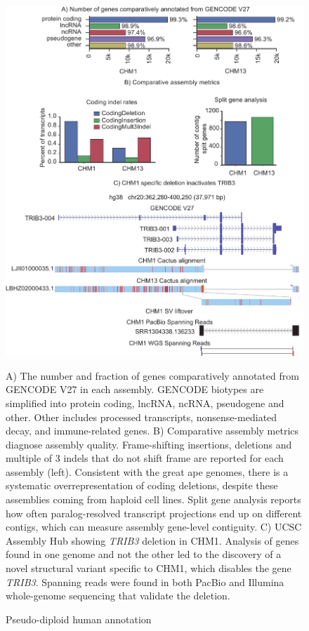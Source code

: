 \documentclass[fleqn,10pt]{wlscirep}
\begin{document}
\begin{figure}
\centering
\includegraphics[width=\textwidth,height=0.7\textheight,keepaspectratio]{figure3-human-v2.pdf}
\caption{Pseudo-diploid human annotation}
A) The number and fraction of genes comparatively annotated from GENCODE V27 in each assembly. GENCODE biotypes are simplified into protein coding, lncRNA, ncRNA, pseudogene and other. Other includes processed transcripts, nonsense-mediated decay, and immune-related genes. B) Comparative assembly metrics diagnose assembly quality. Frame-shifting insertions, deletions and multiple of 3 indels that do not shift frame are reported for each assembly (left). Consistent with the great ape genomes, there is a systematic overrepresentation of coding deletions, despite these assemblies coming from haploid cell lines. Split gene analysis reports how often paralog-resolved transcript projections end up on different contigs, which can measure assembly gene-level contiguity. 
C) UCSC Assembly Hub\cite{nguyen2014comparative} showing \textit{TRIB3} deletion in CHM1. Analysis of genes found in one genome and not the other led to the discovery of a novel structural variant specific to CHM1, which disables the gene \textit{TRIB3}. Spanning reads were found in both PacBio and Illumina whole-genome sequencing that validate the deletion.
\label{fig:diploid_human}
\end{figure}
\end{document}
